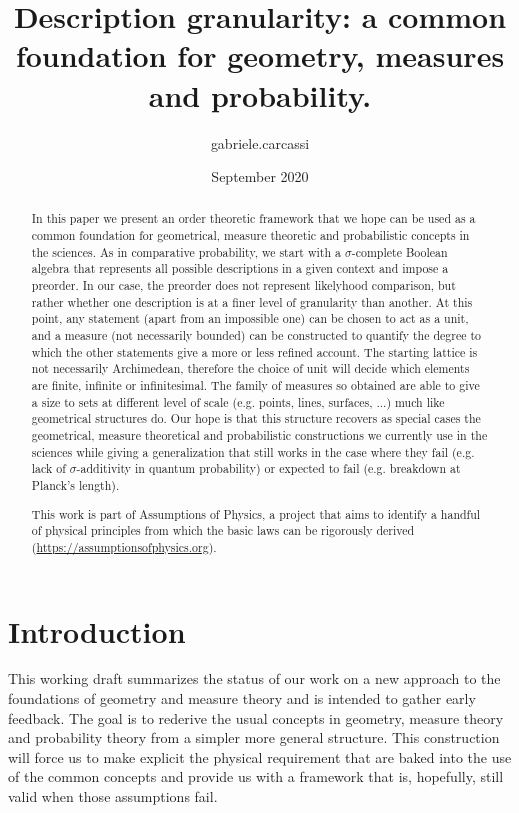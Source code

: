\documentclass{article}
\title{Description granularity: a common foundation for geometry, measures and probability.}
\author{gabriele.carcassi }
\date{September 2020}
\begin{document}
\maketitle

\begin{abstract}
    In this paper we present an order theoretic framework that we hope can be used as a common foundation for geometrical, measure theoretic and probabilistic concepts in the sciences. As in comparative probability, we start with a $\sigma$-complete Boolean algebra that represents all possible descriptions in a given context and impose a preorder. In our case, the preorder does not represent likelyhood comparison, but rather whether one description is at a finer level of granularity than another. At this point, any statement (apart from an impossible one) can be chosen to act as a unit, and a measure (not necessarily bounded) can be constructed to quantify the degree to which the other statements give a more or less refined account. The starting lattice is not necessarily Archimedean, therefore the choice of unit will decide which elements are finite, infinite or infinitesimal. The family of measures so obtained are able to give a size to sets at different level of scale (e.g. points, lines, surfaces, ...) much like geometrical structures do. Our hope is that this structure recovers as special cases the geometrical, measure theoretical and probabilistic constructions we currently use in the sciences while giving a generalization that still works in the case where they fail (e.g. lack of $\sigma$-additivity in quantum probability) or expected to fail (e.g. breakdown at Planck's length).
    
	This work is part of Assumptions of Physics, a project that aims to identify a handful of physical principles from which the basic laws can be rigorously derived  (\url{https://assumptionsofphysics.org}).
\end{abstract}

\def\eqgran{\doteq}
\def\finer{\leqdot}
\def\nfiner{\nleqdot}
\def\coarser{\geqdot}
\def\ncoarser{\ngeqdot}
\def\sfiner{\lessdot}
\def\scoarser{\gtrdot}

\section{Introduction}

This working draft summarizes the status of our work on a new approach to the foundations of geometry and measure theory and is intended to gather early feedback. The goal is to rederive the usual concepts in geometry, measure theory and probability theory from a simpler more general structure. This construction will force us to make explicit the physical requirement that are baked into the use of the common concepts and provide us with a framework that is, hopefully, still valid when those assumptions fail.
\end{document}
